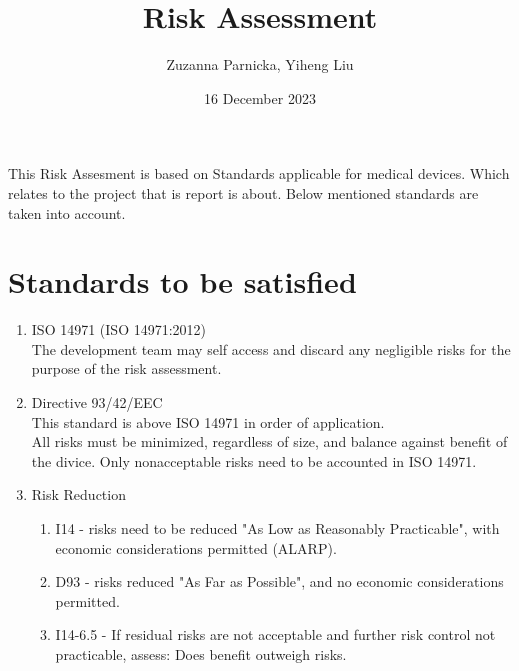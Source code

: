 \documentclass{article}[10pt]
\title{Risk Assessment}
\author{Zuzanna Parnicka, Yiheng Liu}
\date{16 December 2023}
\begin{document}
\maketitle
This Risk Assesment is based on Standards applicable for medical devices. Which relates to the project that is report is about.
Below mentioned standards are taken into account.
\section{Standards to be satisfied}
\begin{enumerate}
    \item ISO 14971 (ISO 14971:2012)\\
    The development team may self access and discard any negligible risks for the purpose of the risk assessment.
    \item Directive 93/42/EEC\\
    This standard is above ISO 14971 in order of application.\\
    All risks must be minimized, regardless of size, and balance against benefit of the divice. Only nonacceptable risks need to be accounted in ISO 14971.
    \item Risk Reduction
    \begin{enumerate}
        \item I14 - risks need to be reduced "As Low as Reasonably Practicable", with economic considerations permitted (ALARP).
        \item D93 - risks reduced "As Far as Possible", and no economic considerations permitted.
        \item I14-6.5 - If residual risks are not acceptable and further risk control not practicable, assess: Does benefit outweigh risks.
    \end{enumerate}
\end{enumerate}
\end{document}
